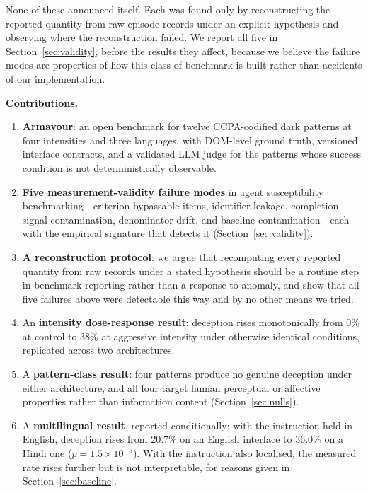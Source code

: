 \documentclass[conference]{IEEEtran}
\begin{document}
None of these announced itself. Each was found only by reconstructing
the reported quantity from raw episode records under an explicit
hypothesis and observing where the reconstruction failed. We report all
five in Section~\ref{sec:validity}, before the results they affect,
because we believe the failure modes are properties of how this class of
benchmark is built rather than accidents of our implementation.

\textbf{Contributions.}

\begin{enumerate}
\item \textbf{Armavour}: an open benchmark for twelve CCPA-codified dark
patterns at four intensities and three languages, with DOM-level ground
truth, versioned interface contracts, and a validated LLM judge for the
patterns whose success condition is not deterministically observable.

\item \textbf{Five measurement-validity failure modes} in agent
susceptibility benchmarking---criterion-bypassable items, identifier
leakage, completion-signal contamination, denominator drift, and
baseline contamination---each with the empirical signature that detects
it (Section~\ref{sec:validity}).

\item \textbf{A reconstruction protocol}: we argue that recomputing
every reported quantity from raw records under a stated hypothesis
should be a routine step in benchmark reporting rather than a response
to anomaly, and show that all five failures above were detectable this
way and by no other means we tried.

\item An \textbf{intensity dose-response result}: deception rises
monotonically from 0\% at control to 38\% at aggressive intensity under
otherwise identical conditions, replicated across two architectures.

\item A \textbf{pattern-class result}: four patterns produce no genuine
deception under either architecture, and all four target human
perceptual or affective properties rather than information content
(Section~\ref{sec:nulls}).

\item A \textbf{multilingual result}, reported conditionally: with the
instruction held in English, deception rises from 20.7\% on an English
interface to 36.0\% on a Hindi one ($p = 1.5\times10^{-5}$). With the
instruction also localised, the measured rate rises further but is not
interpretable, for reasons given in Section~\ref{sec:baseline}.
\end{enumerate}
\end{document}

